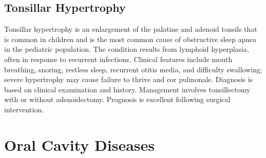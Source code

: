 \subsection{Tonsillar Hypertrophy}
\label{sec:Tonsillar Hypertrophy}
Tonsillar hypertrophy is an enlargement of the palatine and adenoid tonsils that is common in children and is the most common cause of obstructive sleep apnea in the pediatric population. The condition results from lymphoid hyperplasia, often in response to recurrent infections. Clinical features include mouth breathing, snoring, restless sleep, recurrent otitis media, and difficulty swallowing; severe hypertrophy may cause failure to thrive and cor pulmonale. Diagnosis is based on clinical examination and history. Management involves tonsillectomy with or without adenoidectomy. Prognosis is excellent following surgical intervention.

\section{Oral Cavity Diseases}








\label{sec:Oral Cavity Diseases}

